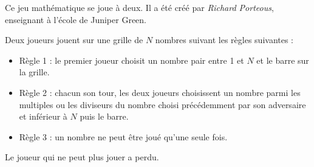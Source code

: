 \begin{enigme}

   Ce jeu mathématique se joue à deux. Il a été créé par {\it Richard Porteous}, enseignant à l'école de Juniper Green. \bigskip
   
      Deux joueurs jouent sur une grille de $N$ nombres suivant les règles suivantes :
      \begin{itemize}
         \item Règle 1 : le premier joueur choisit un nombre pair entre 1 et $N$ et le barre sur la grille.
         \item Règle 2 : chacun son tour, les deux joueurs choisissent un nombre parmi les multiples ou les diviseurs du nombre choisi précédemment par son adversaire et inférieur à $N$ puis le barre.
         \item Règle 3 : un nombre ne peut être joué qu'une seule fois.
      \end{itemize}
      Le joueur qui ne peut plus jouer a perdu. \\
      

\end{enigme}
